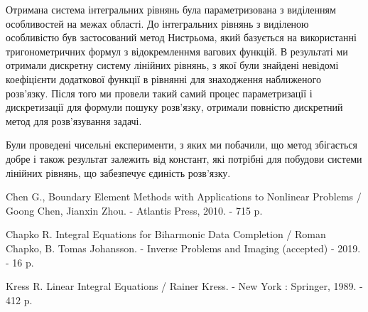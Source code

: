 \documentclass[12pt]{report}
\begin{document}
Отримана система інтегральних рівнянь була параметризована з виділенням особливостей на межах області. До інтегральних рівнянь з виділеною особливістю був застосований метод Нистрьома, який базується на використанні тригонометричних формул з відокремленнмя вагових функцій. В результаті ми отримали дискретну систему лінійних рівнянь, з якої були знайдені невідомі коефіцієнти додаткової функції в рівнянні для знаходження наближеного розв'язку. Після того ми провели такий самий процес параметризації і дискретизації для формули пошуку розв'язку, отримали повністю дискретний метод для розв'язування задачі.

Були проведені чисельні експерименти, з яких ми побачили, що метод збігається добре і також результат залежить від констант, які потрібні для побудови системи лінійних рівнянь, що забезпечує єдиність розв'язку.
\newpage

\begin{thebibliography}{99}
Chen G., Boundary Element Methods with Applications to Nonlinear Problems / Goong Chen, Jianxin Zhou. - Atlantis Press, 2010. - 715 p.

Chapko R. Integral Equations for Biharmonic Data Completion / Roman Chapko, B. Tomas Johansson. - Inverse Problems and Imaging (accepted) - 2019. - 16 p.
 
Kress R. Linear Integral Equations / Rainer Kress. - New York : Springer, 1989. - 412 p.

\end{thebibliography}
\end{document}
